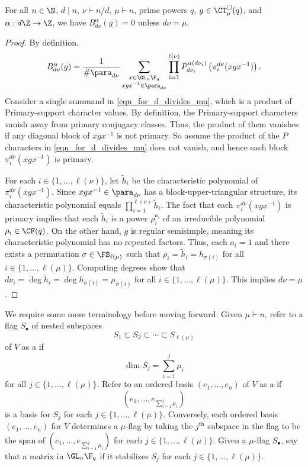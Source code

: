 \begin{lemma}
\label{d_divides_mu}
For all \(n \in \N\), \(d \mid n\), \(\nu \vdash n / d\), \(\mu \vdash n\), prime powers \(q\), \(g \in \CT_\mu^\Box (q)\), and \(\alpha : d \Z \to \Z\), we have \(B_{d\nu}^\alpha(g) = 0\) unless \(d \nu = \mu\).
\end{lemma}
\begin{proof}
By definition,
\begin{equation}
\label{eqn_for_d_divides_mu}
B_{d \nu}^\alpha (g)
=
\frac{1}{\#\para_{d \nu}}
\sum_{\substack{x \in \GL_n \F_q \\ xgx^{-1} \in \para_{d \nu}}}
\prod_{i = 1}^{\ell(\nu)}
P_{d \nu_i}^{\alpha (d \nu_i)} \left (\pi^{d \nu}_i (xgx^{-1}) \right ).
\end{equation}
Consider a single summand in \eqref{eqn_for_d_divides_mu}, which is a product of Primary-support character values.
By definition, the Primary-support characters vanish away from primary conjugacy classes.
Thus, the product of them vanishes if any diagonal block of \(xgx^{-1}\) is not primary.
So assume the product of the $P$ characters in \eqref{eqn_for_d_divides_mu} does not vanish, and hence each block \(\pi_i^{d \nu} (xgx^{-1})\) is primary.

For each \(i \in \{1,\ldots,\ell(\nu)\}\), let \(\tilde{h}_i\) be the characteristic polynomial of \(\pi^{d \nu}_i (xgx^{-1})\).
Since \(xgx^{-1} \in \para_{d \nu}\) has a block-upper-triangular structure, its characteristic polynomial equals \(\prod_{i=1}^{\ell(\nu)} \tilde{h}_i\).
The fact that each \(\pi^{d \nu}_i ( xgx^{-1})\) is primary implies that each \(\tilde{h}_i\) is a power \(\rho_i^{a_i}\) of an irreducible polynomial \(\rho_i \in \CF (q)\).
On the other hand, \(g\) is regular semisimple, meaning its characteristic polynomial has no repeated factors.
Thus, each \(a_i = 1\) and there exists a permutation \(\sigma \in \FS_{\ell(\mu)}\) such that \(\rho_i = \tilde{h}_i = h_{\sigma(i)}\) for all \(i \in \{1,\ldots,\ell(\mu)\}\).
Computing degrees show that \(d \nu_i = \deg \tilde{h}_i = \deg h_{\sigma(i)} = \mu_{\sigma(i)}\) for all \(i \in \{1,\ldots,\ell(\mu)\}\).
This implies \(d \nu = \mu\).
\end{proof}



We require some more terminology before moving forward.
Given \(\mu \vdash n\), refer to a flag $S_\bullet$ of nested subspaces
$$ S_1 \subset S_2 \subset \cdots \subset S_{\ell(\mu)}$$
of $V$
as a  if
$$\dim S_j = \sum_{i=1}^j \mu_i$$ for all $j \in \{1,\ldots,\ell(\mu)\}$.
Refer to an ordered basis $(e_1,\ldots,e_{n})$ of $V$ as a  if
$$ \left (e_1,\ldots,e_{\sum_{i=1}^j \mu_i} \right ) $$
is a basis for $S_j$ for each $j \in \{1,\ldots,\ell(\mu)\}$.
Conversely, each ordered basis \((e_1,\ldots,e_n)\) for \(V\) determines a \(\mu\)-flag by taking the \(j^\text{th}\) subspace in the flag to be the span of \(\left ( e_1,\ldots,e_{\sum_{i=1}^j \mu_i} \right )\) for each \(j \in \{1,\ldots,\ell(\mu)\}\).
Given a $\mu$-flag $S_\bullet$, say that a matrix in $\GL_{n} \F_q$  if it stabilizes $S_j$ for each $j \in \{1,\ldots,\ell(\mu)\}$.

